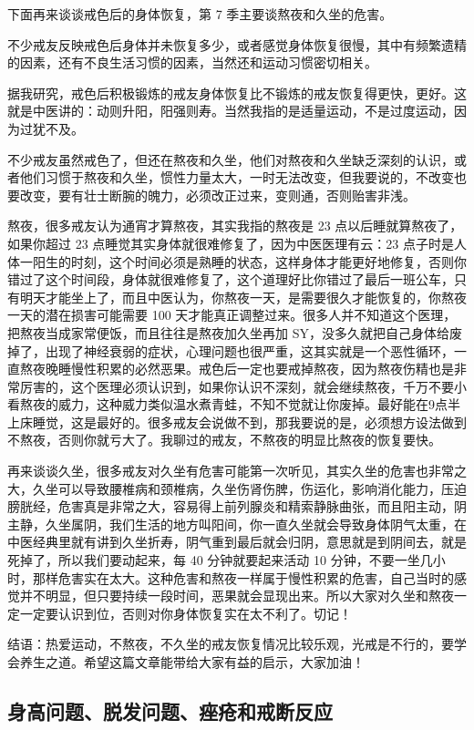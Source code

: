 \documentclass[fontset=founder]{ctexart}
\begin{document}
下面再来谈谈戒色后的身体恢复，第 7 季主要谈熬夜和久坐的危害。

不少戒友反映戒色后身体并未恢复多少，或者感觉身体恢复很慢，其中有频繁遗精的因素，还有不良生活习惯的因素，当然还和运动习惯密切相关。

据我研究，戒色后积极锻炼的戒友身体恢复比不锻炼的戒友恢复得更快，更好。这就是中医讲的：动则升阳，阳强则寿。当然我指的是适量运动，不是过度运动，因为过犹不及。

不少戒友虽然戒色了，但还在熬夜和久坐，他们对熬夜和久坐缺乏深刻的认识，或者他们习惯于熬夜和久坐，惯性力量太大，一时无法改变，但我要说的，不改变也要改变，要有壮士断腕的魄力，必须改正过来，变则通，否则贻害非浅。

熬夜，很多戒友认为通宵才算熬夜，其实我指的熬夜是 23 点以后睡就算熬夜了，如果你超过 23 点睡觉其实身体就很难修复了，因为中医医理有云：23 点子时是人体一阳生的时刻，这个时间必须是熟睡的状态，这样身体才能更好地修复，否则你错过了这个时间段，身体就很难修复了，这个道理好比你错过了最后一班公车，只有明天才能坐上了，而且中医认为，你熬夜一天，是需要很久才能恢复的，你熬夜一天的潜在损害可能需要 100 天才能真正调整过来。很多人并不知道这个医理，把熬夜当成家常便饭，而且往往是熬夜加久坐再加 SY，没多久就把自己身体给废掉了，出现了神经衰弱的症状，心理问题也很严重，这其实就是一个恶性循环，一直熬夜晚睡慢性积累的必然恶果。戒色后一定也要戒掉熬夜，因为熬夜伤精也是非常厉害的，这个医理必须认识到，如果你认识不深刻，就会继续熬夜，千万不要小看熬夜的威力，这种威力类似温水煮青蛙，不知不觉就让你废掉。最好能在9点半上床睡觉，这是最好的。很多戒友会说做不到，那我要说的是，必须想方设法做到不熬夜，否则你就亏大了。我聊过的戒友，不熬夜的明显比熬夜的恢复要快。

再来谈谈久坐，很多戒友对久坐有危害可能第一次听见，其实久坐的危害也非常之大，久坐可以导致腰椎病和颈椎病，久坐伤肾伤脾，伤运化，影响消化能力，压迫膀胱经，危害真是非常之大，容易得上前列腺炎和精索静脉曲张，而且阳主动，阴主静，久坐属阴，我们生活的地方叫阳间，你一直久坐就会导致身体阴气太重，在中医经典里就有讲到久坐折寿，阴气重到最后就会归阴，意思就是到阴间去，就是死掉了，所以我们要动起来，每 40 分钟就要起来活动 10 分钟，不要一坐几小时，那样危害实在太大。这种危害和熬夜一样属于慢性积累的危害，自己当时的感觉并不明显，但只要持续一段时间，恶果就会显现出来。所以大家对久坐和熬夜一定一定要认识到位，否则对你身体恢复实在太不利了。切记！

结语：热爱运动，不熬夜，不久坐的戒友恢复情况比较乐观，光戒是不行的，要学会养生之道。希望这篇文章能带给大家有益的启示，大家加油！

\subsection{身高问题、脱发问题、痤疮和戒断反应}
\end{document}
